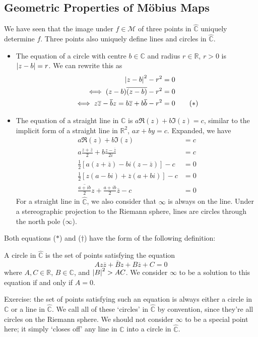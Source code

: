 \documentclass{article}
\begin{document}
\subsection{Geometric Properties of M\"obius Maps}
We have seen that the image under $f \in \mathcal M$ of three points in $\hat{\mathbb C}$ uniquely determine $f$. Three points also uniquely define lines and circles in $\hat{\mathbb C}$.
\begin{itemize}
	\item The equation of a circle with centre $b \in \mathbb C$ and radius $r \in \mathbb R$, $r > 0$ is $\abs{z-b} = r$. We can rewrite this as
	      \begin{align*}
		      \abs{z-b}^2 - r^2                                                        & = 0              \\
		      \iff (z-b)\overline{(z-b)} - r^2                                         & = 0              \\
		      \iff z\overline{z} - \overline{b}z = b\overline{z} + b\overline{b} - r^2 & = 0 \tag{$\ast$}
	      \end{align*}
	\item The equation of a straight line in $\mathbb C$ is $a \Re(z) + b \Im(z) = c$, similar to the implicit form of a straight line in $\mathbb R^2$, $ax+by=c$. Expanded, we have
	      \begin{align*}
		      a \Re(z) + b \Im(z)                                                      & = c                 \\
		      a \frac{z + \overline z}{2} + b \frac{z - \overline z}{2i}               & = c                 \\
		      \frac{1}{2}\left[ a (z + \overline z) - bi (z - \overline z) \right] - c & = 0                 \\
		      \frac{1}{2}\left[ z(a-bi) + \overline z(a+bi) \right] - c                & = 0                 \\
		      \overline{\frac{a + ib}{2}}z + \frac{a+ib}{2}\overline{z} - c            & = 0 \tag{$\dagger$}
	      \end{align*}
	      For a straight line in $\hat{\mathbb C}$, we also consider that $\infty$ is always on the line. Under a stereographic projection to the Riemann sphere, lines are circles through the north pole ($\infty$).
\end{itemize}
Both equations ($\ast$) and ($\dagger$) have the form of the following definition:
\begin{definition}
	A circle in $\hat{\mathbb C}$ is the set of points satisfying the equation
	\[ Az\overline z + \overline B z + B \overline z + C = 0 \]
	where $A, C \in \mathbb R$, $B \in \mathbb C$, and $\abs{B}^2 > AC$. We consider $\infty$ to be a solution to this equation if and only if $A = 0$.
\end{definition}
Exercise: the set of points satisfying such an equation is always either a circle in $\mathbb C$ or a line in $\hat{\mathbb C}$. We call all of these `circles' in $\hat{\mathbb C}$ by convention, since they're all circles on the Riemann sphere. We should not consider $\infty$ to be a special point here; it simply `closes off' any line in $\mathbb C$ into a circle in $\hat{\mathbb C}$.
\end{document}
